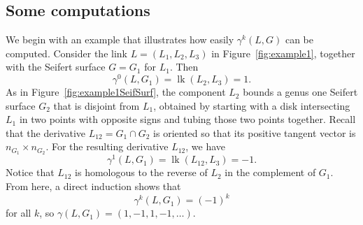 \documentclass[a4paper, 11pt]{amsart}
\theoremstyle{definition}
\newcommand{\lk}{\operatorname{lk}}
\begin{document}




\subsection{Some computations}\label{subsec:computations}We begin with an example that illustrates how easily $\gamma^k(L,G)$ can be computed. Consider the link $L=(L_1, L_2, L_3)$ in Figure~\ref{fig:example1}, together with the Seifert surface $G=G_1$ for $L_1$. Then
\[
\gamma^0(L,G_1)=\lk(L_2,L_3)=1.
\]
As in Figure~\ref{fig:example1SeifSurf}, the component $L_2$ bounds a genus one Seifert surface $G_2$ that is disjoint from $L_1$, obtained by starting with a disk intersecting $L_1$ in two points with opposite signs and tubing those two points together. Recall that the derivative $L_{12}=G_1\cap G_2$ is oriented so that its positive tangent vector is $n_{G_1}\times n_{G_2}$. For the resulting derivative $L_{12}$, we have
\[
\gamma^1(L,G_1)=\lk(L_{12},L_3)=-1.
\]
Notice that $L_{12}$ is homologous to the reverse of $L_2$ in the complement of $G_1$. From here, a direct induction shows that
\[
\gamma^k(L,G_1)=(-1)^k
\]
for all $k$, so $\gamma(L,G_1)=(1,-1,1,-1,\dots)$.
\end{document}
